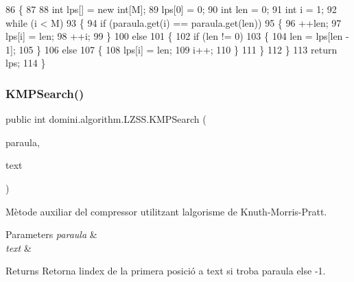 \begin{DoxyCode}
86     \{ 
87         
88         \textcolor{keywordtype}{int} lps[] = \textcolor{keyword}{new} \textcolor{keywordtype}{int}[M]; 
89         lps[0] = 0;
90         \textcolor{keywordtype}{int} len = 0; 
91         \textcolor{keywordtype}{int} i = 1; 
92         \textcolor{keywordflow}{while} (i < M)
93         \{ 
94             \textcolor{keywordflow}{if} (paraula.get(i) == paraula.get(len))
95             \{ 
96                 ++len; 
97                 lps[i] = len; 
98                 ++i; 
99             \} 
100             \textcolor{keywordflow}{else}
101             \{ 
102                 \textcolor{keywordflow}{if} (len != 0)
103                 \{ 
104                     len = lps[len - 1];
105                 \} 
106                 \textcolor{keywordflow}{else}
107                 \{ 
108                     lps[i] = len; 
109                     i++; 
110                 \} 
111             \} 
112         \} 
113         \textcolor{keywordflow}{return} lps;
114     \}
\end{DoxyCode}
\mbox{\label{classdomini_1_1algorithm_1_1LZSS_a94b98f9eb4a4f60b9b773ecbf7fba276}} 
\subsubsection{\texorpdfstring{K\+M\+P\+Search()}{KMPSearch()}}
{\footnotesize\ttfamily public int domini.\+algorithm.\+L\+Z\+S\+S.\+K\+M\+P\+Search (\begin{DoxyParamCaption}\item[{Array\+List$<$ Byte $>$}]{paraula,  }\item[{\hyperlink{classdomini_1_1utils_1_1ArrayCircular}{Array\+Circular}}]{text }\end{DoxyParamCaption})\hspace{0.3cm}{\ttfamily [inline]}}



Mètode auxiliar del compressor utilitzant l\textquotesingle{}algorisme de Knuth-\/\+Morris-\/\+Pratt. 


\begin{DoxyParams}{Parameters}
{\em paraula} & \\
\hline
{\em text} & \\
\hline
\end{DoxyParams}
\begin{DoxyReturn}{Returns}
Retorna l\textquotesingle{}index de la primera posició a text si troba paraula else -\/1. 
\end{DoxyReturn}

